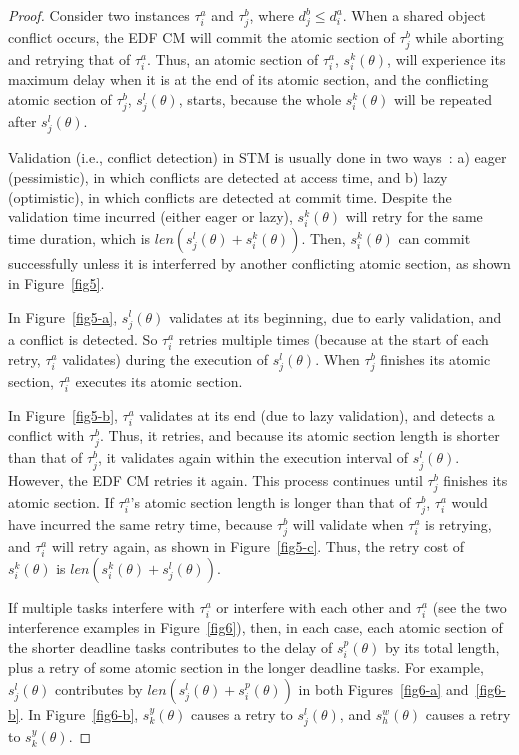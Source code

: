\documentclass[12pt,english]{report}
\newtheorem{proof}{Proof}
\begin{document}
\begin{proof}\normalfont
Consider two instances $\tau_{i}^a$ and $\tau_{j}^b$, where $d_j^b \le d_i^a$. When a shared object conflict occurs, the EDF CM will commit the atomic section of $\tau_j^b$ while aborting and retrying that of $\tau_i^a$.
Thus, an atomic section of $\tau_i^a$, $s_{i}^{k}(\theta)$,
will experience its maximum delay when it is at the end of its atomic section,  
and the conflicting atomic section of $\tau_j^b$, $s_{j}^{l}(\theta)$, starts, because the whole $s_i^k (\theta)$ will be repeated after $s_j^l (\theta)$.

Validation (i.e., conflict detection) in STM is usually done in two ways~\cite{austenmc:tcc:dissertation:2009}: a) eager (pessimistic), in which conflicts are detected at access time, and b) lazy (optimistic), in which conflicts are detected at commit time. Despite the validation time incurred (either eager or lazy),  
$s_{i}^{k}(\theta)$ will retry for the same time duration, which is $len(s_{j}^{l}(\theta)+s_i^k(\theta))$. Then, $s_i^k(\theta)$ can commit successfully  
unless it is interferred by another conflicting atomic section, as shown in Figure~\ref{fig5}. 

In Figure~\ref{fig5-a}, $s_{j}^{l}(\theta)$
validates at its beginning, due to early validation, and a conflict
is detected. So $\tau_{i}^a$ retries multiple times (because at the start of each retry, $\tau_{i}^a$ validates) 
during the execution of $s_{j}^{l}(\theta)$.
When $\tau_{j}^b$ finishes its atomic section, $\tau_{i}^a$ executes its atomic section. 

In Figure~\ref{fig5-b}, 
$\tau_{i}^a$ validates at its end (due to lazy validation), and detects a conflict with $\tau_{j}^b$.
Thus, it retries, and because its atomic section length is shorter
than that of $\tau_{j}^b$, it validates again within the execution
interval of $s_{j}^{l}(\theta)$. However, the EDF CM retries it again.
This process continues until $\tau_{j}^b$ finishes its atomic section.
If $\tau_{i}^a$'s atomic section length is longer than that of $\tau_{j}^b$,
$\tau_{i}^a$ would have incurred the same retry time, because
$\tau_{j}^b$ will validate when $\tau_{i}^a$ is retrying, and $\tau_{i}^a$ will
retry again, as shown in Figure~\ref{fig5-c}. Thus, the retry cost
of $s_{i}^{k}(\theta)$ is $len(s_{i}^{k}(\theta)+s_{j}^{l}(\theta))$.

If multiple tasks interfere with $\tau_{i}^a$ or
interfere with each other and $\tau_{i}^a$ (see the two interference examples in Figure~\ref{fig6}), then, in each case, each atomic section of the shorter deadline tasks contributes to the delay of $s_{i}^{p}(\theta)$ by its total length, plus a retry of some atomic section in the longer deadline tasks. For example,
$s_{j}^{l}(\theta)$ contributes by $len(s_{j}^{l}(\theta)+s_{i}^{p}(\theta))$
in both Figures~\ref{fig6-a} and~\ref{fig6-b}. 
In Figure~\ref{fig6-b}, $s_{k}^{y}(\theta)$ causes a retry 
to $s_{j}^{l}(\theta)$, and $s_{h}^{w}(\theta)$ causes a retry to $s_{k}^{y}(\theta)$.



\end{proof}
\end{document}
